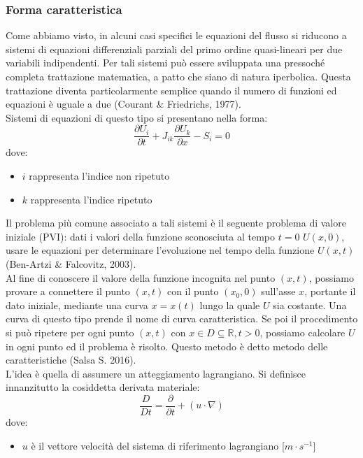 \documentclass[12pt]{article} %
\begin{document}
\subsubsection{Forma caratteristica}
\noindent Come abbiamo visto, in alcuni casi specifici le equazioni del flusso si riducono a sistemi di equazioni differenziali parziali del primo ordine quasi-lineari per due variabili indipendenti. Per tali sistemi può essere sviluppata una pressoché completa trattazione matematica, a patto che siano di natura iperbolica. Questa trattazione diventa particolarmente semplice quando il numero di funzioni ed equazioni è uguale a due (Courant \& Friedrichs, 1977). \\
\noindent Sistemi di equazioni di questo tipo si presentano nella forma:
\begin{equation}
    \frac{\partial U_i}{\partial t}+J_{ik}\frac{\partial U_k}{\partial x}-S_i  = 0
    \label{eqn:sistema_iperbolico}
\end{equation}
\noindent dove:
\begin{itemize}
    \item $i$ rappresenta l'indice non ripetuto
    \item $k$ rappresenta l'indice ripetuto
\end{itemize}
\noindent Il problema più comune associato a tali sistemi è il seguente problema di valore iniziale (PVI): dati i valori della funzione sconosciuta al tempo $t=0$ $U(x,0)$, usare le equazioni per determinare l’evoluzione nel tempo della funzione $U(x,t)$ (Ben-Artzi \& Falcovitz, 2003).\\
Al fine di conoscere il valore della funzione incognita nel punto $(x,t)$, possiamo provare a connettere il punto $(x,t)$ con il punto $(x_0,0)$ sull'asse $x$, portante il dato iniziale, mediante una curva $x=x(t)$ lungo la quale $U$ sia costante. Una curva di questo tipo prende il nome di curva caratteristica. Se poi il procedimento si può ripetere per ogni punto $(x,t)$ con  $x\in D \subseteq \mathbb{R}, t>0$, possiamo calcolare $ U$ in ogni punto ed il problema è risolto. Questo metodo è detto metodo delle caratteristiche (Salsa S. 2016).\\
L'idea è quella di assumere un atteggiamento lagrangiano. Si definisce innanzitutto la cosiddetta derivata materiale:
\begin{equation}
    \frac{D}{Dt}=\frac{\partial }{\partial t}+\left(u\cdot\nabla\right)
    \label{eqn:derivata_materiale_3D}
\end{equation}
\noindent dove:
\begin{itemize}
    \item $u$ è il vettore velocità del sistema di riferimento lagrangiano [$m\cdot s^{-1}$]
\end{itemize}
\end{document}
